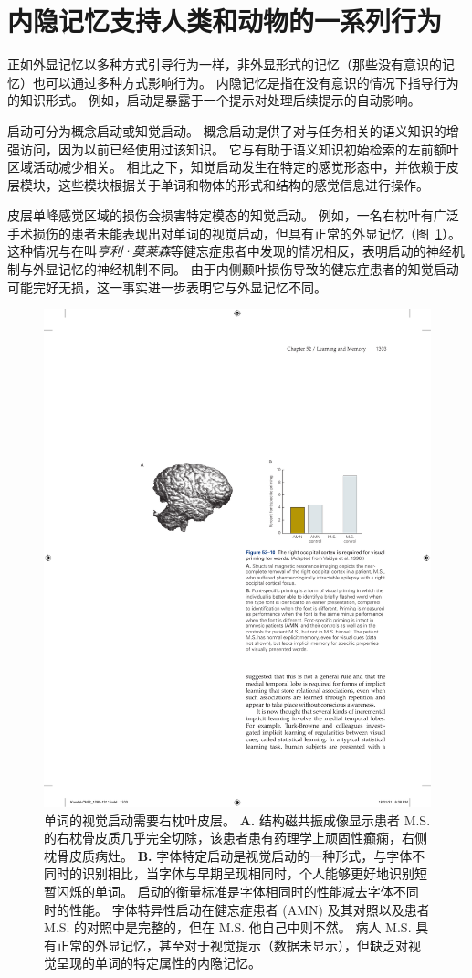 \section{内隐记忆支持人类和动物的一系列行为}

正如外显记忆以多种方式引导行为一样，非外显形式的记忆（那些没有意识的记忆）也可以通过多种方式影响行为。
内隐记忆是指在没有意识的情况下指导行为的知识形式。
例如，启动是暴露于一个提示对处理后续提示的自动影响。


启动可分为概念启动或知觉启动。
概念启动提供了对与任务相关的语义知识的增强访问，因为以前已经使用过该知识。
它与有助于语义知识初始检索的左前额叶区域活动减少相关。
相比之下，知觉启动发生在特定的感觉形态中，并依赖于皮层模块，这些模块根据关于单词和物体的形式和结构的感觉信息进行操作。


皮层单峰感觉区域的损伤会损害特定模态的知觉启动。
例如，一名右枕叶有广泛手术损伤的患者未能表现出对单词的视觉启动，但具有正常的外显记忆（图~\ref{fig:52_10}）。
这种情况与在叫\textit{亨利·莫莱森}等健忘症患者中发现的情况相反，表明启动的神经机制与外显记忆的神经机制不同。
由于内侧颞叶损伤导致的健忘症患者的知觉启动可能完好无损，这一事实进一步表明它与外显记忆不同。


\begin{figure}[htbp]
	\centering
	\includegraphics[width=0.45\linewidth]{chap52/fig_52_10}
	\caption{单词的视觉启动需要右枕叶皮层\cite{vaidya1998font}。
		\textbf{A.} 结构磁共振成像显示患者 M.S. 的右枕骨皮质几乎完全切除，该患者患有药理学上顽固性癫痫，右侧枕骨皮质病灶。
		\textbf{B.} 字体特定启动是视觉启动的一种形式，与字体不同时的识别相比，当字体与早期呈现相同时，个人能够更好地识别短暂闪烁的单词。
		启动的衡量标准是字体相同时的性能减去字体不同时的性能。 字体特异性启动在健忘症患者 (AMN) 及其对照以及患者 M.S. 的对照中是完整的，但在 M.S. 他自己中则不然。
		病人 M.S. 具有正常的外显记忆，甚至对于视觉提示（数据未显示），但缺乏对视觉呈现的单词的特定属性的内隐记忆。}
	\label{fig:52_10}
\end{figure}



